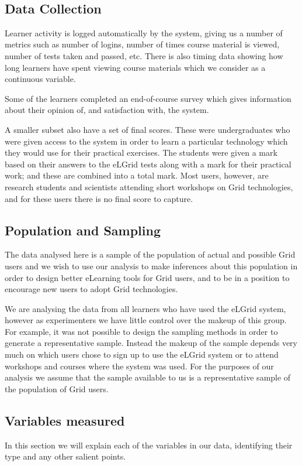 \documentclass[12pt,twoside]{article}
\begin{document}
~ 

\subsection[Data Collection ]{\textrm{Data Collection} }
Learner activity is logged automatically by the system, giving us a
number of metrics such as number of logins, number of times course
material is viewed, number of tests taken and passed, etc. There is
also timing data showing how long learners have spent viewing course
materials which we consider as a continuous variable. 

Some of the learners completed an end{}-of{}-course survey which gives
information about their opinion of, and satisfaction with, the system. 

A smaller subset also have a set of final scores. These were
undergraduates who were given access to the system in order to learn a
particular technology which they would use for their practical
exercises. The students were given a mark based on their answers to the
eLGrid tests along with a mark for their practical work; and these are
combined into a total mark. Most users, however, are research students
and scientists attending short workshops on Grid technologies, and for
these users there is no final score to capture. 

\subsection[Population and Sampling ]{\textrm{Population and Sampling} }
The data analysed here is a sample of the population of actual and
possible Grid users and we wish to use our analysis to make inferences
about this population in order to design better eLearning tools for
Grid users, and to be in a position to encourage new users to adopt
Grid technologies. 

We are analysing the data from all learners who have used the eLGrid
system, however as experimenters we have little control over the makeup
of this group. For example, it was not possible to design the sampling
methods in order to generate a representative sample. Instead the
makeup of the sample depends very much on which users chose to sign up
to use the eLGrid system or to attend workshops and courses where the
system was used. For the purposes of our analysis we assume that the
sample available to us is a representative sample of the population of
Grid users. 

\subsection[Variables measured ]{\textrm{Variables measured} }
In this section we will explain each of the variables in our data,
identifying their type and any other salient points. 
\end{document}
